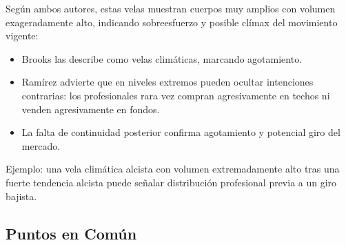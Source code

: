 Seg\'un ambos autores, estas velas muestran cuerpos muy amplios con volumen exageradamente alto, indicando sobreesfuerzo y posible cl\'imax del movimiento vigente:

\begin{itemize}
    \item Brooks las describe como velas clim\'aticas, marcando agotamiento.
    \item Ram\'irez advierte que en niveles extremos pueden ocultar intenciones contrarias: los profesionales rara vez compran agresivamente en techos ni venden agresivamente en fondos.
    \item La falta de continuidad posterior confirma agotamiento y potencial giro del mercado.
\end{itemize}

Ejemplo: una vela clim\'atica alcista con volumen extremadamente alto tras una fuerte tendencia alcista puede se\~nalar distribuci\'on profesional previa a un giro bajista.

\subsection*{Puntos en Com\'un}


